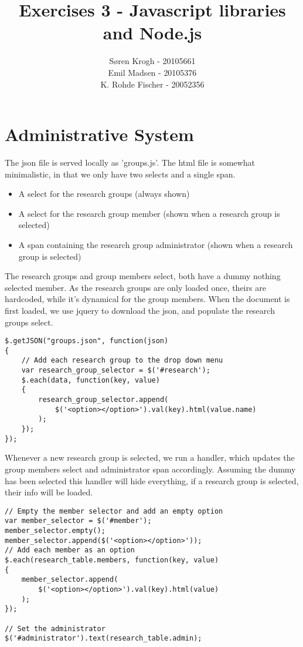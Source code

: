 \documentclass[a4paper,10pt]{article}
\author{
Søren Krogh -  20105661 \\
Emil Madsen - 20105376  \\
K. Rohde Fischer - 20052356\\}
\title{Exercises 3 - Javascript libraries and Node.js}
\begin{document}
\maketitle

\section*{Administrative System}
The json file is served locally as 'groups.js'.
The html file is somewhat minimalistic, in that we only have two selects and a single span.
\begin{itemize}
\item A select for the research groups (always shown)
\item A select for the research group member (shown when a research group is selected)
\item A span containing the research group administrator (shown when a research group is selected)
\end{itemize}
The research groups and group members select, both have a dummy nothing selected member.
As the research groups are only loaded once, theirs are hardcoded, while it's dynamical for the group members.
When the document is first loaded, we use jquery to download the json, and populate the research groups select.
\begin{verbatim}
$.getJSON("groups.json", function(json)
{
    // Add each research group to the drop down menu
    var research_group_selector = $('#research');
    $.each(data, function(key, value)
    {
        research_group_selector.append(
            $('<option></option>').val(key).html(value.name)
        );
    });
});
\end{verbatim}
Whenever a new research group is selected, we run a handler, which updates the group members select and administrator span accordingly. 
Assuming the dummy has been selected this handler will hide everything, if a research group is selected, their info will be loaded.
\begin{verbatim}
// Empty the member selector and add an empty option
var member_selector = $('#member');
member_selector.empty();
member_selector.append($('<option></option>'));
// Add each member as an option
$.each(research_table.members, function(key, value)
{
    member_selector.append(
        $('<option></option>').val(key).html(value)
    );
});

// Set the administrator
$('#administrator').text(research_table.admin);
\end{verbatim}
\end{document}
